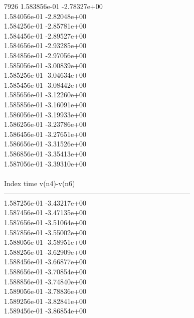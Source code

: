 7926	1.583856e-01	-2.78327e+00	\\ 	1.584056e-01	-2.82048e+00	\\ 	1.584256e-01	-2.85781e+00	\\ 	1.584456e-01	-2.89527e+00	\\ 	1.584656e-01	-2.93285e+00	\\ 	1.584856e-01	-2.97056e+00	\\ 	1.585056e-01	-3.00839e+00	\\ 	1.585256e-01	-3.04634e+00	\\ 	1.585456e-01	-3.08442e+00	\\ 	1.585656e-01	-3.12260e+00	\\ 	1.585856e-01	-3.16091e+00	\\ 	1.586056e-01	-3.19933e+00	\\ 	1.586256e-01	-3.23786e+00	\\ 	1.586456e-01	-3.27651e+00	\\ 	1.586656e-01	-3.31526e+00	\\ 	1.586856e-01	-3.35413e+00	\\ 	1.587056e-01	-3.39310e+00	\\ \hline
\\ \hline
Index   time            v(n4)-v(n6)     \\ \hline
--------------------------------------------------------------------------------\\ 	1.587256e-01	-3.43217e+00	\\ 	1.587456e-01	-3.47135e+00	\\ 	1.587656e-01	-3.51064e+00	\\ 	1.587856e-01	-3.55002e+00	\\ 	1.588056e-01	-3.58951e+00	\\ 	1.588256e-01	-3.62909e+00	\\ 	1.588456e-01	-3.66877e+00	\\ 	1.588656e-01	-3.70854e+00	\\ 	1.588856e-01	-3.74840e+00	\\ 	1.589056e-01	-3.78836e+00	\\ 	1.589256e-01	-3.82841e+00	\\ 	1.589456e-01	-3.86854e+00	\\ \hline
